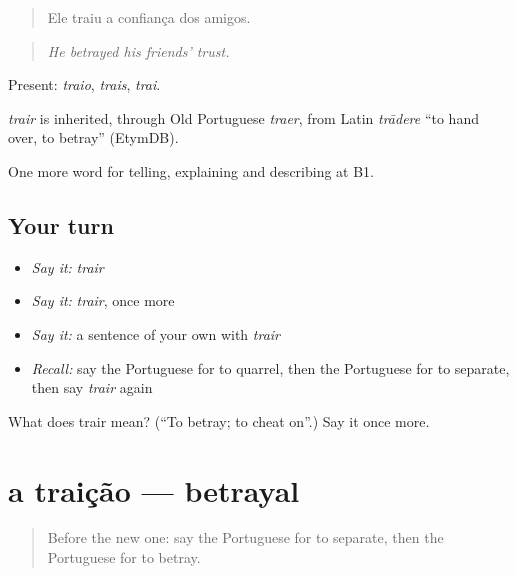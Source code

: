 \begin{quote}
Ele traiu a confiança dos amigos.
\end{quote}

\begin{quote}
\emph{He betrayed his friends' trust.}
\end{quote}

Present: \emph{traio}, \emph{trais}, \emph{trai}.

\begin{cousinweb}
\emph{trair} is inherited, through Old Portuguese \emph{traer}, from Latin \emph{trādere} \textquotedblleft{}to hand over, to betray\textquotedblright{} (EtymDB).
\end{cousinweb}

\begin{grammarlens}[title={What you've built}]
One more word for telling, explaining and describing at B1.
\end{grammarlens}

\subsection*{Your turn}
\begin{itemize}
\raggedright
  \item \emph{Say it:} \emph{trair}
  \item \emph{Say it:} \emph{trair}, once more
  \item \emph{Say it:} a sentence of your own with \emph{trair}
  \item \emph{Recall:} say the Portuguese for to quarrel, then the Portuguese for to separate, then say \emph{trair} again
\end{itemize}

\begin{tcolorbox}[breakable,colback=teal!4,colframe=teal!35!black,title={Before you move on}]
What does trair mean? (\textquotedblleft{}To betray; to cheat on\textquotedblright{}.) Say it once more.
\end{tcolorbox}
\section[a traição]{a traição — betrayal}

\label{lesson:PT-C497-traicao}



\begin{quote}
Before the new one: say the Portuguese for to separate, then the Portuguese for to betray.
\end{quote}

